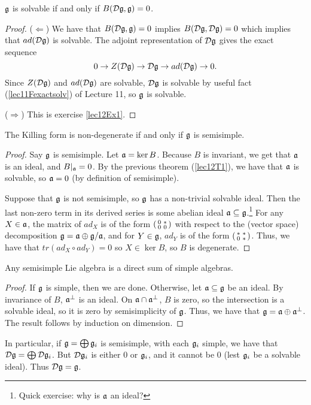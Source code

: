  \begin{corollary}\label{lec12CorT1}
   $\mathfrak{g}$ is solvable if and only if $B(\mathcal{D}\mathfrak{g},\mathfrak{g})=0$.
 \end{corollary}
 \begin{proof} ($\Leftarrow$)
   We have that $B(\mathcal{D}\mathfrak{g},\mathfrak{g})=0$ implies $B(\mathcal{D}\mathfrak{g},\mathcal{D}\mathfrak{g})=0$ which  implies that $ad
   (\mathcal{D}\mathfrak{g})$ is solvable.
   The adjoint representation of $\mathcal{D}\mathfrak{g}$ gives the exact sequence
   \[
    0\to Z(\mathcal{D}\mathfrak{g}) \to \mathcal{D}\mathfrak{g} \to ad(\mathcal{D}\mathfrak{g}) \to 0.
   \]
   Since $Z(\mathcal{D}\mathfrak{g})$ and $ad(\mathcal{D}\mathfrak{g})$ are solvable, $\mathcal{D}\mathfrak{g}$ is solvable by useful
   fact (\ref{lec11Fexactsolv}) of Lecture 11, so $\mathfrak{g}$ is solvable.

   ($\Rightarrow$) This is exercise \ref{lec12Ex1}.
 \end{proof}

 \begin{theorem}\label{lec12Cartan}
    The Killing form is non-degenerate if and only if $\mathfrak{g}$ is semisimple.
 \end{theorem}
 \begin{proof}
   Say $\mathfrak{g}$ is semisimple. Let $\mathfrak{a}=\ker B$. Because $B$ is invariant, we get that $\mathfrak{a}$
   is an ideal, and $B|_{\mathfrak{a}}=0$. By the previous theorem (\ref{lec12T1}), we have that
   $\mathfrak{a}$ is solvable, so $\mathfrak{a}=0$ (by definition of semisimple).


   Suppose that $\mathfrak{g}$ is not semisimple, so $\mathfrak{g}$ has a non-trivial solvable ideal. Then
   the last non-zero term in its derived series is some abelian ideal $\mathfrak{a}\subseteq
   \mathfrak{g}$.\footnote{Quick exercise: why is $\mathfrak{a}$ an ideal?} For any $X\in \mathfrak{a}$, the matrix
   of $ad_X$ is of the form $\left( \begin{smallmatrix} 0 & \ast \\ 0 & 0 \end{smallmatrix} \right)$ with respect to the (vector
   space) decomposition $\mathfrak{g}=\mathfrak{a}\oplus \mathfrak{g}/\mathfrak{a}$, and for $Y\in \mathfrak{g}$, $ad_Y$ is of the form
   $\left( \begin{smallmatrix} \ast & \ast \\ 0 & \ast \end{smallmatrix} \right)$. Thus, we have that $tr(ad_X\circ ad_Y)=0$ so $X\in
   \ker B$, so $B$ is degenerate.
 \end{proof}

 \begin{theorem}
   Any semisimple Lie algebra is a direct sum of simple algebras.
 \end{theorem}
 \begin{proof}
   If $\mathfrak{g}$ is simple, then we are done. Otherwise, let $\mathfrak{a}\subseteq \mathfrak{g}$ be an ideal.
   By invariance of $B$, $\mathfrak{a}^\perp$ is an ideal. On $\mathfrak{a}\cap \mathfrak{a}^\perp$, $B$ is zero, so
   the intersection is a solvable ideal, so it is zero by semisimplicity of $\mathfrak{g}$.
   Thus, we have that $\mathfrak{g}=\mathfrak{a}\oplus\mathfrak{a}^\perp$. The result follows by induction on
   dimension.
 \end{proof}
 \begin{remark}
   In particular, if $\mathfrak{g} = \bigoplus \mathfrak{g}_i$ is semisimple, with each $\mathfrak{g}_i$ simple, we
   have that $\mathcal{D} \mathfrak{g} = \bigoplus \mathcal{D}\mathfrak{g}_i$. But $\mathcal{D} \mathfrak{g}_i$ is either $0$ or $\mathfrak{g}_i$, and it
   cannot be $0$ (lest $\mathfrak{g}_i$ be a solvable ideal). Thus $\mathcal{D}\mathfrak{g}=\mathfrak{g}$.
 \end{remark}

